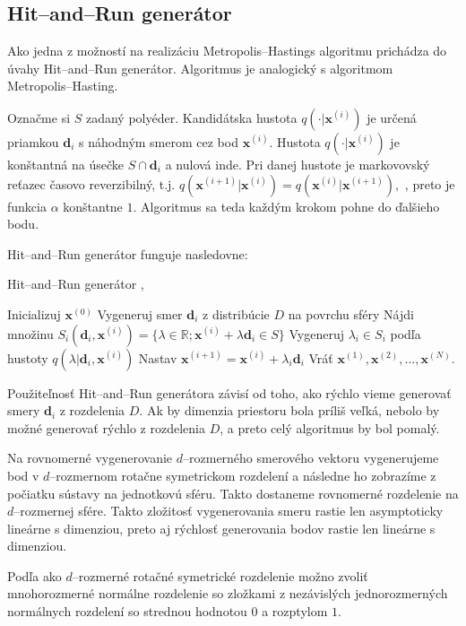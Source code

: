 \subsection{Hit--and--Run generátor}

Ako jedna z možností na realizáciu Metropolis--Hastings algoritmu prichádza do úvahy Hit--and--Run generátor. Algoritmus je analogický s algoritmom Metropolis--Hasting.

Označme si $S$ zadaný polyéder. Kandidátska hustota $q(\cdot|\mathbf x^{(i)})$ je určená priamkou $\mathbf d_i$ s náhodným smerom cez bod $\mathbf x^{(i)}$. Hustota $q(\cdot|\mathbf x^{(i)})$ je konštantná na úsečke \newline $S \cap \mathbf d_i$ a nulová inde. Pri danej hustote je markovovský reťazec časovo reverzibilný, t.j. $q(\mathbf x^{(i+1)}|\mathbf x^{(i)})=q(\mathbf x^{(i)}|\mathbf x^{(i+1)}),$ \cite{hit-and-run_chen}, preto je funkcia $\alpha$ konštantne $1$. Algoritmus sa teda každým krokom pohne do ďalšieho bodu.

Hit--and--Run generátor funguje nasledovne:

\begin{algorithm}[H]
	\caption{Hit--and--Run generátor \cite{hit-and-run_chen},\cite{zhluky_lukacek}}
	\label{hit--and--run}
	\begin{algorithmic}[1]
		\State Inicializuj $\mathbf x^{(0)}$
			\State Vygeneruj smer $\mathbf d_i$ z distribúcie $D$ na povrchu sféry
			\State Nájdi množinu $S_i(\mathbf d_i,\mathbf x^{(i)})=\{\lambda \in \mathbb{R}; \mathbf x^{(i)} + \lambda \mathbf d_i \in S \} $
			\State Vygeneruj $\lambda_i \in S_i$ podľa hustoty $q(\lambda | \mathbf d_i, \mathbf x^{(i)})$
			\State Nastav $\mathbf x^{(i+1)}=\mathbf x^{(i)}+\lambda_i \mathbf d_i$
		\EndFor
		\State Vráť $\mathbf x^{(1)},\mathbf x^{(2)},\dots,\mathbf x^{(N)}$.
	\end{algorithmic}
\end{algorithm}

Použiteľnosť Hit--and--Run generátora závisí od toho, ako rýchlo vieme generovať smery $\mathbf d_i$ z rozdelenia $D$. Ak by dimenzia priestoru bola príliš veľká, nebolo by možné generovať rýchlo z rozdelenia $D$, a preto celý algoritmus by bol pomalý. 

Na rovnomerné vygenerovanie $d$--rozmerného smerového vektoru vygenerujeme bod v $d$--rozmernom rotačne symetrickom rozdelení a následne ho zobrazíme z počiatku sústavy na jednotkovú sféru. Takto dostaneme rovnomerné rozdelenie na $d$--rozmernej sfére. Takto zložitosť vygenerovania smeru rastie len asymptoticky lineárne s dimenziou, preto aj rýchlosť generovania bodov rastie len lineárne s dimenziou.

Podľa \cite{spheres_harman} ako $d$--rozmerné rotačné symetrické rozdelenie možno zvoliť mnohorozmerné normálne rozdelenie so zložkami z nezávislých jednorozmerných normálnych rozdelení so strednou hodnotou $0$ a rozptylom $1$.
